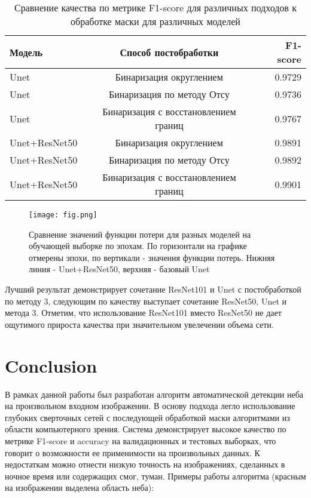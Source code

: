 \documentclass[runningheads]{llncs}
\begin{document}
{\begin{table}[H]
\begin{minipage}{.45\linewidth}
    \end{minipage}%
	\hspace{2em}
    \begin{minipage}{.45\linewidth}
      \centering
      \caption{Сравнение качества по метрике F1-score для различных
подходов к обработке маски для различных моделей}
\label{tab3}
        \begin{tabular}{|l|c|r|}
\hline
Модель & Способ постобработки & F1-score\\
\hline
Unet & Бинаризация округлением & 0.9729 \\
Unet & Бинаризация по методу Отсу & 0.9736 \\ 
Unet & Бинаризация с восстановлением границ &  0.9767 \\ 
Unet+ResNet50 & Бинаризация округлением & 0.9891 \\ 
Unet+ResNet50 & Бинаризация по методу Отсу & 0.9892 \\
Unet+ResNet50 & Бинаризация с восстановлением границ & 0.9901 \\ \hline
\end{tabular}
    \end{minipage} 
\end{table}


\begin{figure}[H]
\texttt{[image: fig.png]}
\caption{Сравнение значений функции потери для разных моделей 
на обучающей выборке по эпохам. По горизонтали
на графике отмерены эпохи, по вертикали - значения
функции потерь. Нижняя линия - Unet+ResNet50, верхняя 
- базовый Unet} \label{fig2}
\end{figure}

Лучший результат демонстрирует сочетание ResNet101 и Unet с постобработкой по методу 3, следующим по качеству выступает сочетание ResNet50, Unet и метода 3. Отметим, что использование ResNet101 вместо ResNet50 не дает ощутимого прироста качества при значительном увелечении объема сети.


\section{Conclusion}
В рамках данной работы был разработан алгоритм автоматической 
детекции неба на произвольном входном изображении. В основу
подхода легло использование глубоких сверточных сетей с последующей 
обработкой маски алгоритмами из области компьютерного зрения. 
Система демонстрирует высокое качество по метрике F1-score и
accuracy на валидационных и тестовых выборках, что говорит о возможности 
ее применимости на произвольных данных. К недостаткам
можно отнести низкую точность на изображениях, сделанных в ночное 
время или содержащих смог, туман.
Примеры работы алгоритма (красным на изображении выделена 
область неба):

}
\end{document}
